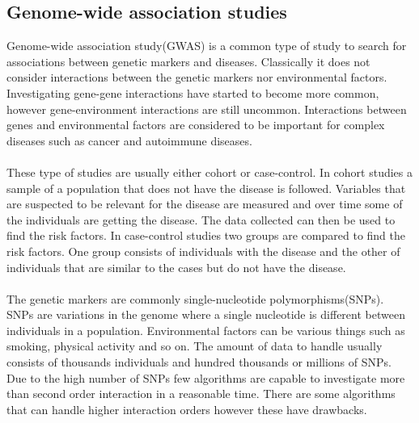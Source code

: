 \documentclass[10pt,a4paper]{article}
\begin{document}
\subsection{Genome-wide association studies}
Genome-wide association study(GWAS) is a common type of study to search for associations between genetic markers and diseases. Classically it does not consider interactions between the genetic markers nor environmental factors. Investigating gene-gene interactions have started to become more common\cite{cordell_detect_review}, however gene-environment interactions are still uncommon\cite{gene_enviroment_2013}. Interactions between genes and environmental factors are considered to be important for complex diseases such as cancer and autoimmune diseases.\cite{cordell_detect_review, gene_enviroment_2013, geira, ra_smoking}\\
\\
These type of studies are usually either cohort or case-control. In cohort studies a sample of a population that does not have the disease is followed. Variables that are suspected to be relevant for the disease are measured and over time some of the individuals are getting the disease. The data collected can then be used to find the risk factors. In case-control studies two groups are compared to find the risk factors. One group consists of individuals with the disease and the other of individuals that are similar to the cases but do not have the disease.\cite{rothman1998modern,mann_observational}\\
\\
The genetic markers are commonly single-nucleotide polymorphisms(SNPs). SNPs are variations in the genome where a single nucleotide is different between individuals in a population\cite{fareed_snp}. Environmental factors can be various things such as smoking, physical activity and so on. The amount of data to handle usually consists of thousands individuals and hundred thousands or millions of SNPs. Due to the high number of SNPs few algorithms are capable to investigate more than second order interaction in a reasonable time. There are some algorithms that can handle higher interaction orders however these have drawbacks\cite{gwis,high_order_2012,fast_high_order_cluster}.
\end{document}
